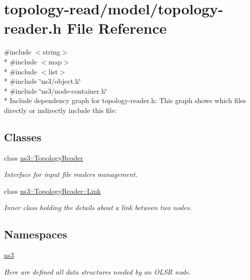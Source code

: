 \hypertarget{topology-reader_8h}{}\section{topology-\/read/model/topology-\/reader.h File Reference}
\label{topology-reader_8h}
{\ttfamily \#include $<$string$>$}\\*
{\ttfamily \#include $<$map$>$}\\*
{\ttfamily \#include $<$list$>$}\\*
{\ttfamily \#include \char`\"{}ns3/object.\+h\char`\"{}}\\*
{\ttfamily \#include \char`\"{}ns3/node-\/container.\+h\char`\"{}}\\*
Include dependency graph for topology-\/reader.h\+:
This graph shows which files directly or indirectly include this file\+:
\subsection*{Classes}
\begin{DoxyCompactItemize}
\item 
class \hyperlink{classns3_1_1TopologyReader}{ns3\+::\+Topology\+Reader}
\begin{DoxyCompactList}\small\item\em Interface for input file readers management. \end{DoxyCompactList}\item 
class \hyperlink{classns3_1_1TopologyReader_1_1Link}{ns3\+::\+Topology\+Reader\+::\+Link}
\begin{DoxyCompactList}\small\item\em Inner class holding the details about a link between two nodes. \end{DoxyCompactList}\end{DoxyCompactItemize}
\subsection*{Namespaces}
\begin{DoxyCompactItemize}
\item 
 \hyperlink{namespacens3}{ns3}
\begin{DoxyCompactList}\small\item\em Here are defined all data structures needed by an O\+L\+SR node. \end{DoxyCompactList}\end{DoxyCompactItemize}
